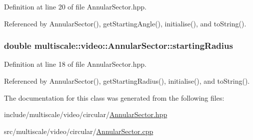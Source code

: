 Definition at line 20 of file Annular\-Sector.\-hpp.



Referenced by Annular\-Sector(), get\-Starting\-Angle(), initialise(), and to\-String().

\hypertarget{classmultiscale_1_1video_1_1AnnularSector_a4c0094d8993edb40b15580fa58a8a393}{
\subsubsection[{starting\-Radius}]{\setlength{\rightskip}{0pt plus 5cm}double multiscale\-::video\-::\-Annular\-Sector\-::starting\-Radius\hspace{0.3cm}{\ttfamily [private]}}}\label{classmultiscale_1_1video_1_1AnnularSector_a4c0094d8993edb40b15580fa58a8a393}


Definition at line 18 of file Annular\-Sector.\-hpp.



Referenced by Annular\-Sector(), get\-Starting\-Radius(), initialise(), and to\-String().



The documentation for this class was generated from the following files\-:\begin{DoxyCompactItemize}
\item 
include/multiscale/video/circular/\hyperlink{AnnularSector_8hpp}{Annular\-Sector.\-hpp}\item 
src/multiscale/video/circular/\hyperlink{AnnularSector_8cpp}{Annular\-Sector.\-cpp}\end{DoxyCompactItemize}
